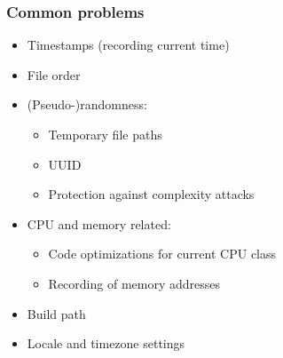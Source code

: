 \documentclass[14pt,aspectratio=169]{beamer}
\begin{document}
\begin{frame}
 \frametitle{Common problems}

 \begin{itemize}
  \item Timestamps (recording current time)
  \item File order
  \item (Pseudo-)randomness:
   \begin{itemize}
    \item Temporary file paths
    \item UUID
    \item Protection against complexity attacks
   \end{itemize}
  \item CPU and memory related:
   \begin{itemize}
    \item Code optimizations for current CPU class
    \item Recording of memory addresses
   \end{itemize}
  \item Build path
  \item Locale and timezone settings
 \end{itemize}
\end{frame}

\begin{frame}[plain]
\end{frame}
\end{document}
